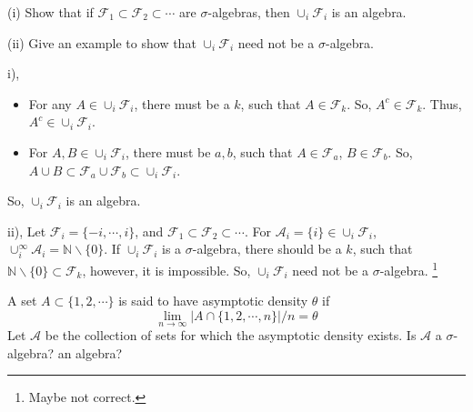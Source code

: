 \documentclass[en, normal, 11pt, black]{elegantnote}
\newenvironment{exercise}[1]{\begin{tcolorbox}[colback=black!15, colframe=black!80, breakable, title=#1]}{\end{tcolorbox}}
\renewenvironment{proof}{\begin{tcolorbox}[colback=white, colframe=black!50, breakable, title=Proof. ]\setlength{\parskip}{0.8em}}{\\\rightline{$\square$}\end{tcolorbox}}
\begin{document}
    \begin{exercise}{1.1.4}
        (i) Show that if $\mathcal{F}_1\subset\mathcal{F}_2\subset\cdots$ are $\sigma$-algebras, then $\cup_i\mathcal{F}_i$ is an algebra. 
        
        (ii) Give an example to show that $\cup_i\mathcal{F}_i$ need not be a $\sigma$-algebra. 
    \end{exercise}
    \begin{proof}
        i), 
        \begin{itemize}
            \item For any $A\in\cup_i\mathcal{F}_i$, there must be a $k$, such that $A\in\mathcal{F}_k$. So, $A^c\in\mathcal{F}_k$. Thus, $A^c\in\cup_i\mathcal{F}_i$. 
            \item For $A, B\in\cup_i\mathcal{F}_i$, there must be $a,b$, such that $A\in\mathcal{F}_a$, $B\in\mathcal{F}_b$. So, $A\cup B\subset\mathcal{F}_a\cup\mathcal{F}_b\subset\cup_i\mathcal{F}_i$. 
        \end{itemize} 
        So, $\cup_i\mathcal{F}_i$ is an algebra. 

        ii), Let $\mathcal{F}_i=\{-i,\cdots,i\}$, and $\mathcal{F}_1\subset\mathcal{F}_2\subset\cdots$. 
        For $\mathcal{A}_i=\{i\}\in\cup_i\mathcal{F}_i$, $\cup_i^{\infty}\mathcal{A}_i=\mathbb{N}\backslash\{0\}$. 
        If $\cup_i\mathcal{F}_i$ is a $\sigma$-algebra, there should be a $k$, such that $\mathbb{N}\backslash\{0\}\subset\mathcal{F}_k$, however, it is impossible. So, $\cup_i\mathcal{F}_i$ need not be a $\sigma$-algebra. \footnote{Maybe not correct. }
    \end{proof}
    \begin{exercise}{1.1.5}
        A set $A \subset \{1,2, \cdots\}$ is said to have asymptotic density $\theta$ if
        \[
        \lim _{n \rightarrow \infty}|A \cap\{1,2, \cdots, n\}| / n=\theta
        \]
        Let $\mathcal{A}$ be the collection of sets for which the asymptotic density exists. Is $\mathcal{A}$ a $\sigma$-algebra? an algebra?
    \end{exercise}
\end{document}

